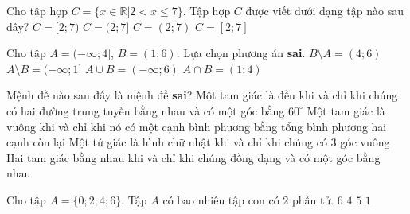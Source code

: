 \begin{ex}%
	Cho tập hợp $C=\{x\in\mathbb{R}| 2<x\leq 7\}$. Tập hợp $C$ được viết dưới dạng tập nào sau đây?
	\choice
	{$C=[2;7)$}
	{\True $C=(2;7]$}
	{$C=(2;7)$}
	{$C=[2;7]$}
	\loigiai{Ta có $C=\{x\in\mathbb{R}| 2<x\leq 7\}=(2;7]$.}
\end{ex}

\begin{ex}%
	Cho tập $A=(-\infty;4]$, $B=(1;6)$. Lựa chọn phương án \textbf{sai}.
	\choice
	{$B\setminus A=(4;6)$}
	{$A\setminus B= (-\infty;1]$}
	{$A\cup B=(-\infty;6)$}
	{\True $A\cap B= (1;4)$}
	\loigiai{Ta có 
		\begin{itemize}
			\begin{multicols}{2}
				\item $B\setminus A=(4;6)$.
				\item $A\setminus B =(-\infty;1]$.
				\item $A\cup B= (-\infty;6)$.
				\item $A\cap B=(1;4]$.
			\end{multicols}
	\end{itemize}}
\end{ex}

\begin{ex}%
	Mệnh đề nào sau đây là mệnh đề \textbf{sai}?
	\choice
	{Một tam giác là đều khi và chỉ khi chúng có hai đường trung tuyến bằng nhau và có một góc bằng $60^\circ$}
	{Một tam giác là vuông khi và chỉ khi nó có một cạnh bình phương bằng tổng bình phương hai cạnh còn lại}
	{Một tứ giác là hình chữ nhật khi và chỉ khi chúng có $3$ góc vuông}
	{\True Hai tam giác bằng nhau khi và chỉ khi chúng đồng dạng và có một góc bằng nhau}
\end{ex}

\begin{ex}%
	Cho tập $A=\{0; 2; 4; 6\}$. Tập $A$ có bao nhiêu tập con có $2$ phần tử.
	\choice
	{\True $6$}
	{$4$}
	{$5$}
	{$1$}
\end{ex}

